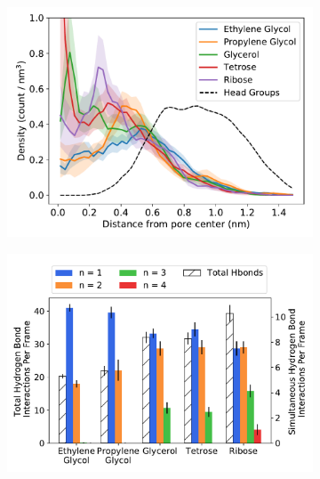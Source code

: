 \documentclass{article}
\begin{document}
  \begin{figure}[!htb]
  \centering
  \begin{subfigure}{0.45\textwidth}
  \includegraphics[width=\linewidth]{polyols_rdf.pdf}
  \caption{}\label{fig:polyols_rdf}
  \end{subfigure}
  \begin{subfigure}{0.45\textwidth}
  \includegraphics[width=\linewidth]{multi_hbonds.pdf}
  \caption{}\label{fig:multi_hbonds}
  \end{subfigure}
  \begin{subfigure}{\textwidth}
  \centering

\end{subfigure}
\end{figure}
\end{document}
